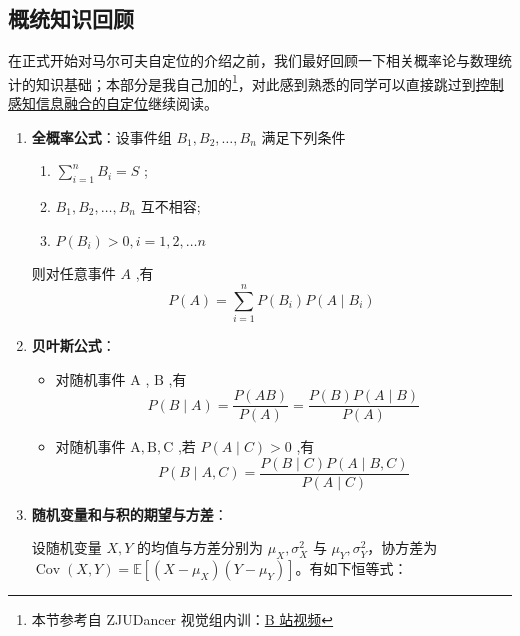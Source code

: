 \documentclass[../main.tex]{subfiles}
\begin{document}
\subsection*{概统知识回顾}
\hspace{2em}在正式开始对马尔可夫自定位的介绍之前，我们最好回顾一下相关概率论与数理统计的知识基础；本部分是我自己加的\footnote{本节参考自 ZJUDancer 视觉组内训：\href{https://www.bilibili.com/video/BV1wUmPYCERx/?spm_id_from=333.337.search-card.all.click&vd_source=5deca47094767260f853b759a625a68f}{B 站视频}}，对此感到熟悉的同学可以直接跳过到\hyperref[sec:markov]{控制感知信息融合的自定位}继续阅读。
    \begin{enumerate}
        \item \textbf{全概率公式}：设事件组 \( {B}_{1},{B}_{2},\ldots ,{B}_{n} \) 满足下列条件
        \begin{enumerate}
            \item \( \mathop{\sum }\limits_{{i = 1}}^{n}{B}_{i} = S \) ;
            \item \( {B}_{1},{B}_{2},\ldots ,{B}_{n} \) 互不相容;
            \item \( P\left( {B}_{i}\right)  > 0,i = 1,2,\ldots n \)
        \end{enumerate}
        则对任意事件 \( A \) ,有 
        $$ P\left( A\right)  = \mathop{\sum }\limits_{{i = 1}}^{n}P\left( {B}_{i}\right) P\left( {A \mid  {B}_{i}}\right) $$

        \item \textbf{贝叶斯公式}：
        \begin{itemize}
            \item 对随机事件 \( \mathrm{A} \) , \( \mathrm{B} \) ,有
            $$ P\left( {B \mid  A}\right)  = \frac{P\left( {AB}\right) }{P\left( A\right) } = \frac{P\left( B\right) P\left( {A \mid  B}\right) }{P\left( A\right) } $$
            \item 对随机事件 \( \mathrm{A},\mathrm{B},\mathrm{C} \) ,若 \( P\left( {A \mid  C}\right)  > 0 \) ,有
            $$ P\left( {B \mid  A,C}\right)  = \frac{P\left( {B \mid  C}\right) P\left( {A \mid  B,C}\right) }{P\left( {A \mid  C}\right) } $$
        \end{itemize}

        \item \textbf{随机变量和与积的期望与方差}：

    设随机变量 $X,Y$ 的均值与方差分别为 $\mu_X,\sigma_X^2$ 与 $\mu_Y,\sigma_Y^2$，协方差为
    $\operatorname{Cov}(X,Y)=\mathbb{E}[(X-\mu_X)(Y-\mu_Y)]$。有如下恒等式：
    

\end{enumerate}
\end{document}
